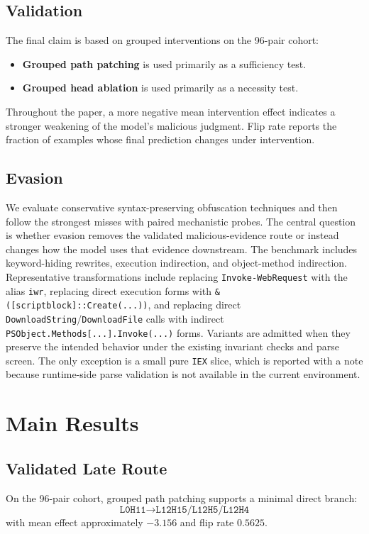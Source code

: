 \documentclass{article}
\begin{document}
\subsection{Validation}
The final claim is based on grouped interventions on the 96-pair cohort:
\begin{itemize}[leftmargin=1.5em]
  \item \textbf{Grouped path patching} is used primarily as a sufficiency test.
  \item \textbf{Grouped head ablation} is used primarily as a necessity test.
\end{itemize}

Throughout the paper, a more negative mean intervention effect indicates a stronger weakening of the model's malicious judgment. Flip rate reports the fraction of examples whose final prediction changes under intervention.

\subsection{Evasion}
We evaluate conservative syntax-preserving obfuscation techniques and then follow the strongest misses with paired mechanistic probes. The central question is whether evasion removes the validated malicious-evidence route or instead changes how the model uses that evidence downstream. The benchmark includes keyword-hiding rewrites, execution indirection, and object-method indirection. Representative transformations include replacing \texttt{Invoke-WebRequest} with the alias \texttt{iwr}, replacing direct execution forms with \texttt{\& ([scriptblock]::Create(...))}, and replacing direct \texttt{DownloadString}/\texttt{DownloadFile} calls with indirect \texttt{PSObject.Methods[...].Invoke(...)} forms. Variants are admitted when they preserve the intended behavior under the existing invariant checks and parse screen. The only exception is a small pure \texttt{IEX} slice, which is reported with a note because runtime-side parse validation is not available in the current environment.

\section{Main Results}
\subsection{Validated Late Route}
On the 96-pair cohort, grouped path patching supports a minimal direct branch:
\[
\texttt{L0H11} \rightarrow \texttt{L12H15/L12H5/L12H4}
\]
with mean effect approximately \(-3.156\) and flip rate \(0.5625\).
\end{document}
